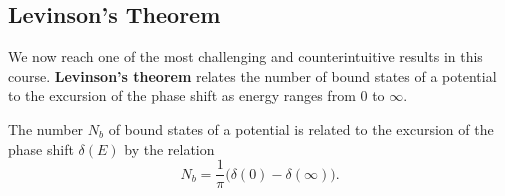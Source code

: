 \subsection{Levinson's Theorem}

We now reach one of the most challenging and counterintuitive results in this course. \textbf{Levinson's theorem} relates the number of bound states of a potential to the excursion of the phase shift as energy ranges from $0$ to $\infty$.

\begin{framedthm}
    The number $N_b$ of bound states of a potential is related to the excursion of the phase shift $\delta(E)$ by the relation $$\boxed{N_b=\frac{1}{\pi}\bigg(\delta(0)-\delta(\infty)\bigg).}$$
\end{framedthm}

